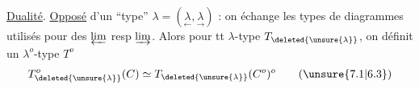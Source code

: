  \uline{Dualité}. \uline{Opposé} d'un ``type'' $\lambda=(\underset{\leftarrow}{\lambda},\underset{\rightarrow}{\lambda})$ : on échange
les types de diagrammes utilisés pour des $\varprojlim$ resp $\varinjlim$.
Alors pour tt $\lambda$-type $T_{\deleted{\unsure{\lambda}}}$, on définit un $\lambda^o$-type $T^o$ 
\[
T^o_{\deleted{\unsure{\lambda}}}(C)\simeq T_{\deleted{\unsure{\lambda}}}(C^o)^o\tag*{(\unsure{7.1|6.3})}
\]
